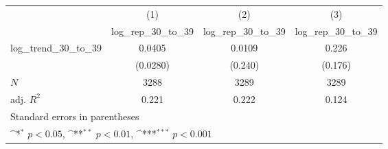 {
\def\sym#1{\ifmmode^{#1}\else\(^{#1}\)\fi}
\begin{tabular}{l*{3}{c}}
\hline\hline
            &\multicolumn{1}{c}{(1)}&\multicolumn{1}{c}{(2)}&\multicolumn{1}{c}{(3)}\\
            &\multicolumn{1}{c}{log\_rep\_30\_to\_39}&\multicolumn{1}{c}{log\_rep\_30\_to\_39}&\multicolumn{1}{c}{log\_rep\_30\_to\_39}\\
\hline
log\_trend\_30\_to\_39&      0.0405         &      0.0109         &       0.226         \\
            &    (0.0280)         &     (0.240)         &     (0.176)         \\
\hline
\(N\)       &        3288         &        3289         &        3289         \\
adj. \(R^{2}\)&       0.221         &       0.222         &       0.124         \\
\hline\hline
\multicolumn{4}{l}{\footnotesize Standard errors in parentheses}\\
\multicolumn{4}{l}{\footnotesize \sym{*} \(p<0.05\), \sym{**} \(p<0.01\), \sym{***} \(p<0.001\)}\\
\end{tabular}
}
